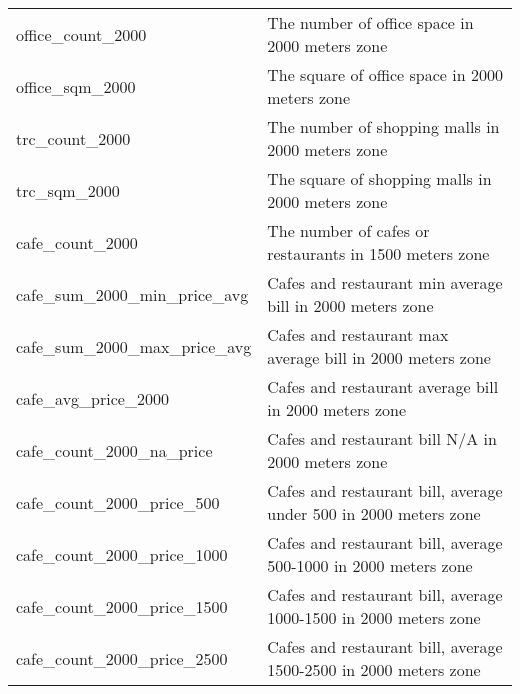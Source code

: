 \begin{longtable}[c]{ll}
    office\_count\_2000                        & The number of office space in 2000 meters zone                                                                            \\
    office\_sqm\_2000                          & The square of office space in 2000 meters zone                                                                            \\
    trc\_count\_2000                           & The number of shopping malls in 2000 meters zone                                                                          \\
    trc\_sqm\_2000                             & The square of shopping malls in 2000 meters zone                                                                          \\
    cafe\_count\_2000                          & The number of cafes or restaurants in 1500 meters zone                                                                    \\
    cafe\_sum\_2000\_min\_price\_avg           & Cafes and restaurant min average bill in 2000 meters zone                                                                 \\
    cafe\_sum\_2000\_max\_price\_avg           & Cafes and restaurant max average bill in 2000 meters zone                                                                 \\
    cafe\_avg\_price\_2000                     & Cafes and restaurant average bill in 2000 meters zone                                                                     \\
    cafe\_count\_2000\_na\_price               & Cafes and restaurant bill N/A in 2000 meters zone                                                                         \\
    cafe\_count\_2000\_price\_500              & Cafes and restaurant bill, average under 500 in 2000 meters zone                                                          \\
    cafe\_count\_2000\_price\_1000             & Cafes and restaurant bill, average  500-1000 in 2000 meters zone                                                          \\
    cafe\_count\_2000\_price\_1500             & Cafes and restaurant bill, average  1000-1500 in 2000 meters zone                                                         \\
    cafe\_count\_2000\_price\_2500             & Cafes and restaurant bill, average  1500-2500 in 2000 meters zone                                                         \\

\end{longtable}

